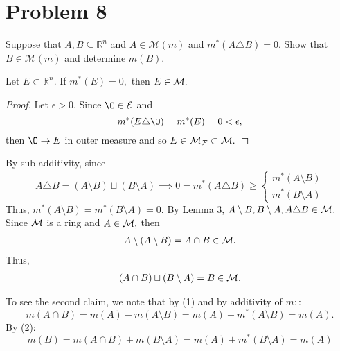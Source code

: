 \documentclass[11pt]{article}
\newcommand{\bbR}{\mathbb{R}}
\renewcommand{\emptyset}{\O}
\newcommand{\sm}{\setminus}
\begin{document}
\newpage
\section*{Problem 8}
\begin{problem}
    Suppose that $A,B \subseteq \bbR^n$ and $A \in \mathcal{M}(m)$ and $m^*(A \triangle B) = 0.$ Show that $B \in \mathcal{M}(m)$ and determine $m(B).$
\end{problem}
\begin{solution}
\begin{lemma}
    Let $E\subset \bbR^n.$ If $m^*(E) = 0,$ then $E\in \cal M.$
\end{lemma}
\begin{proof}
Let $\epsilon>0.$ 
    Since $\emptyset \in \cal E$ and 
    \[m^*(E \triangle \emptyset) = m^*(E) = 0 < \epsilon,\] then $\emptyset \to E$ in outer measure and so $E \in \cal M_F\subset \cal M.$   
\end{proof}

By sub-additivity, since 
\[A \triangle B= (A\sm B) \sqcup (B\sm A) \implies 0  = m^*(A\triangle B)\geq \begin{cases}
    m^*(A \sm B)\\
    m^*(B\sm A)
\end{cases}\]
Thus, $m^*(A\sm B) = m^*(B\sm A) = 0.$ By Lemma 3, $A\sm B, B\sm A, A\triangle B \in \cal M.$ Since $\cal M$ is a ring and $A\in \cal M,$ then 
\begin{align}
A\sm (A\sm B) = A\cap B \in \cal M.    
\end{align}
 Thus, 
 \begin{align}
(A\cap B) \sqcup (B\sm A) = B \in \cal M.     
 \end{align}
 

To see the second claim, we note that by (1) and by additivity of $m:$:
\[m(A \cap B) = m(A) - m(A \sm B) = m(A) - m^*(A\sm B) = m(A).\]
By (2):
\[m(B) = m(A\cap B) + m(B\sm A) = m(A) + m^*(B\sm A) = m(A)\]

\end{solution}
\end{document}

